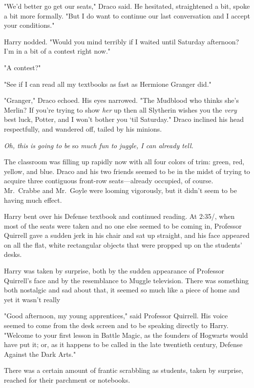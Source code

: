 "We'd better go get our seats," Draco said. He hesitated, straightened a bit,
spoke a bit more formally. "But I do want to continue our last conversation and
I accept your conditions."

Harry nodded. "Would you mind terribly if I waited until Saturday afternoon?
I'm in a bit of a contest right now."

"A contest?"

"See if I can read all my textbooks as fast as Hermione Granger did."

"Granger," Draco echoed. His eyes narrowed. "The Mudblood who thinks she's
Merlin? If you're trying to show \emph{her} up then all Slytherin wishes you
the \emph{very} best luck, Potter, and I won't bother you `til Saturday." Draco
inclined his head respectfully, and wandered off, tailed by his minions.

\emph{Oh, this is going to be} so \emph{much fun to juggle, I can already tell.}

The classroom was filling up rapidly now with all four colors of trim: green,
red, yellow, and blue. Draco and his two friends seemed to be in the midst of
trying to acquire three contiguous front-row seats---already occupied, of
course. Mr.~Crabbe and Mr.~Goyle were looming vigorously, but it didn't seem to
be having much effect.

Harry bent over his Defense textbook and continued reading.
\sbreak
At 2:35\PM/, when most of the seats were taken and no one else seemed to be
coming in, Professor Quirrell gave a sudden jerk in his chair and sat up
straight, and his face appeared on all the flat, white rectangular objects that
were propped up on the students' desks.

Harry was taken by surprise, both by the sudden appearance of Professor
Quirrell's face and by the resemblance to Muggle television. There was
something both nostalgic and sad about that, it seemed so much like a piece of
home and yet it wasn't really{\el}

"Good afternoon, my young apprentices," said Professor Quirrell. His voice
seemed to come from the desk screen and to be speaking directly to Harry.
"Welcome to your first lesson in Battle Magic, as the founders of Hogwarts
would have put it; or, as it happens to be called in the late twentieth
century, Defense Against the Dark Arts."

There was a certain amount of frantic scrabbling as students, taken by
surprise, reached for their parchment or notebooks.

